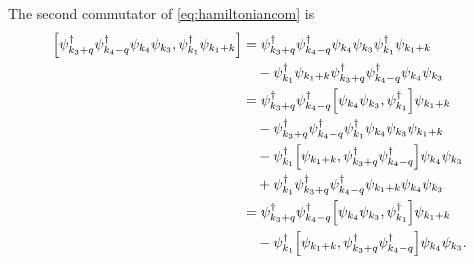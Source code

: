 \documentclass[11pt, a4paper]{report} %
\begin{document}
The second commutator of \cref{eq:hamiltoniancom} is 
\begin{align}
  \label{eq:8}
  \qty[\psi_{k_3+q}^{\dag}\psi_{k_4-q}^{\dag}\psi_{k_4}\psi_{k_3}, \psi_{k_1}^{\dag}\psi_{k_1+k}] &= 
\psi_{k_3+q}^{\dag}\psi_{k_4-q}^{\dag}\psi_{k_4}\psi_{k_3}\psi_{k_1}^{\dag}\psi_{k_1+k} \nonumber\\
& \quad - \psi_{k_1}^{\dag}\psi_{k_1+k}\psi_{k_3+q}^{\dag}\psi_{k_4-q}^{\dag}\psi_{k_4}\psi_{k_3}\\
&=\psi_{k_3+q}^{\dag}\psi_{k_4-q}^{\dag}\qty[\psi_{k_4}\psi_{k_3},\psi_{k_1}^{\dag}]\psi_{k_1+k} \nonumber\\
& \quad - \psi_{k_3+q}^{\dag}\psi_{k_4-q}^{\dag}\psi_{k_1}^{\dag}\psi_{k_4}\psi_{k_3}\psi_{k_1+k} \nonumber\\\
& \quad - \psi_{k_1}^{\dag}\qty[\psi_{k_1+k},\psi_{k_3+q}^{\dag}\psi_{k_4-q}^{\dag}]\psi_{k_4}\psi_{k_3} \nonumber\\
& \quad+ \psi_{k_1}^{\dag}\psi_{k_3+q}^{\dag}\psi_{k_4-q}^{\dag}\psi_{k_1+k}\psi_{k_4}\psi_{k_3}\\
&=\psi_{k_3+q}^{\dag}\psi_{k_4-q}^{\dag}\qty[\psi_{k_4}\psi_{k_3},\psi_{k_1}^{\dag}]\psi_{k_1+k} \nonumber\\
& \quad - \psi_{k_1}^{\dag}\qty[\psi_{k_1+k},\psi_{k_3+q}^{\dag}\psi_{k_4-q}^{\dag}]\psi_{k_4}\psi_{k_3}.
\end{align}
\end{document}
